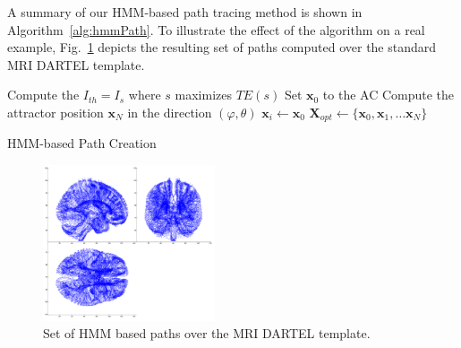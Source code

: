 A summary of our \ac{HMM}-based path tracing method is shown in Algorithm~\ref{alg:hmmPath}. To illustrate the effect of the algorithm on a real example, Fig.~\ref{fig:cuts} depicts the resulting set of paths computed over the standard MRI DARTEL template. 

\begin{algorithm*}
	\BlankLine
	Compute the $I_{th} = I_s$ where $s$ maximizes $TE(s)$\;
	Set $\mathbf{x}_0$ to the AC\;
	Compute the attractor position $\mathbf{x}_N$ in the direction $(\varphi, \theta)$\;
	$\mathbf{x}_i \leftarrow \mathbf{x}_0$\;
	$\mathbf{X}_{opt}\leftarrow \{\mathbf{x}_0, \mathbf{x}_1, \dots \mathbf{x}_N\}$\; 
	
	\caption[\acs{HMM}-based Path Creation]{\ac{HMM}-based Path Creation}\label{alg:hmmPath}
\end{algorithm*}\DecMargin{1em}


\begin{figure}
	\begin{center}
		\includegraphics[width=2in]{gfx/ch6/cuts}
		\caption[Set of \acs{HMM} based paths over the MRI DARTEL template.]{Set of \ac{HMM} based paths over the MRI DARTEL template.}
		\label{fig:cuts}
	\end{center}
\end{figure}


